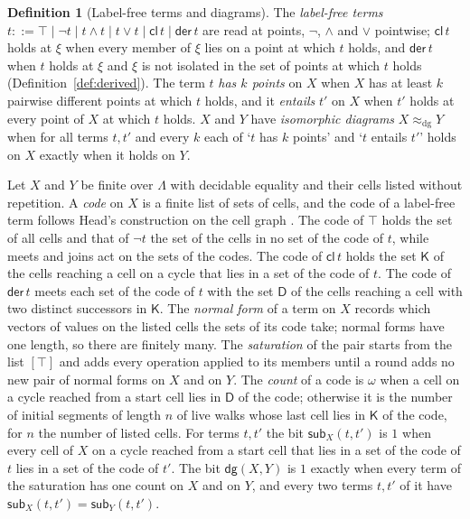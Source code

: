 \documentclass{lmcs}
\theoremstyle{definition}
\newtheorem{definition}[theorem]{Definition}
\theoremstyle{remark}
\providecommand{\tcl}{\mathsf{cl}}
\providecommand{\tder}{\mathsf{der}}
\providecommand{\eqDg}{\approx_{\mathrm{dg}}}
\providecommand{\KK}{\mathsf{K}}
\providecommand{\DD}{\mathsf{D}}
\providecommand{\dgB}{\mathsf{dg}}
\begin{document}
\begin{definition}[Label-free terms and diagrams]\label{def:dec-terms}\label{def:dec-diagram}
The \emph{label-free terms}
$t::=\top\mid\neg t\mid t\wedge t\mid t\vee t\mid\tcl\,t\mid\tder\,t$ are read at points, $\neg$, $\wedge$ and $\vee$
pointwise; $\tcl\,t$ holds at $\xi$ when every member of $\xi$ lies on a point at which $t$ holds, and $\tder\,t$ when $t$
holds at $\xi$ and $\xi$ is not isolated in the set of points at which $t$ holds (Definition~\ref{def:derived}). The term $t$
\emph{has $k$ points} on $X$ when $X$ has at least $k$ pairwise different points at which $t$ holds,
and it \emph{entails} $t'$ on $X$ when $t'$ holds at every point of $X$ at which $t$ holds. $X$
and $Y$ have \emph{isomorphic diagrams} $X\eqDg Y$ when for all terms $t,t'$ and every $k$ each of `$t$ has $k$ points' and
`$t$ entails $t'$' holds on $X$ exactly when it holds on $Y$.
\end{definition}

Let $X$ and $Y$ be finite over $\Lambda$ with decidable equality and their cells listed without repetition. A
\emph{code} on $X$ is a finite list of sets of cells, and the code of a label-free term follows Head's construction
on the cell graph \cite{Head86}. The code of $\top$ holds the set of all cells and that of
$\neg t$ the set of the cells in no set of the code of $t$, while meets and joins act on the sets of the codes. The code of
$\tcl\,t$ holds the set $\KK$ of the cells reaching a cell on a cycle that lies in a set of the code of
$t$. The code of $\tder\,t$ meets each set of the code of $t$ with the set $\DD$ of the cells
reaching a cell with two distinct successors in $\KK$. The \emph{normal form} of a term on
$X$ records which vectors of values on the listed cells the sets of its code take; normal forms have one length, so
there are finitely many. The \emph{saturation} of the pair starts from the
list $[\top]$ and adds every operation applied to its members until a round adds no new pair of normal forms on $X$
and on $Y$. The \emph{count} of a code is $\omega$ when a cell
on a cycle reached from a start cell lies in $\DD$ of the code; otherwise it is the number of initial segments of
length $n$ of live walks whose last cell lies in $\KK$ of the code, for $n$ the number of listed
cells. For terms $t,t'$ the bit $\mathsf{sub}_X(t,t')$ is $1$
when every cell of $X$ on a cycle reached from a start cell that lies in a set of the code of $t$ lies in a set of the
code of $t'$. The bit $\dgB(X,Y)$ is $1$ exactly when every term of the saturation has one count on $X$ and on $Y$, and every
two terms $t,t'$ of it have $\mathsf{sub}_X(t,t')=\mathsf{sub}_Y(t,t')$.
\end{document}
